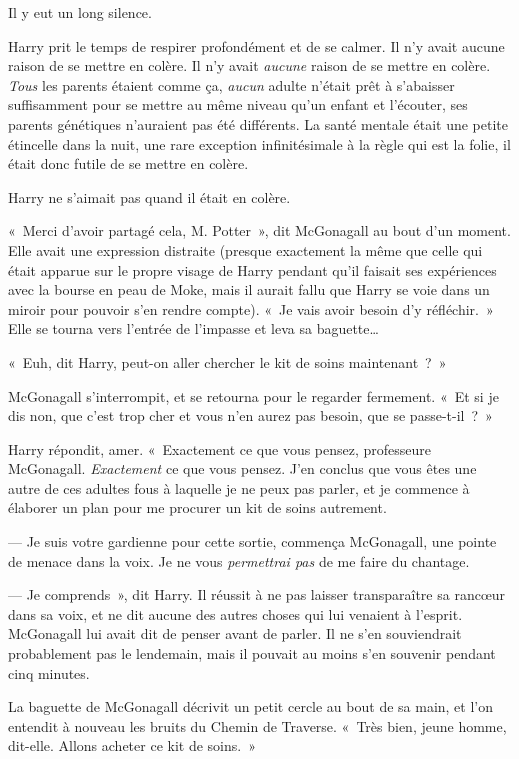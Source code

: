 Il y eut un long silence.

Harry prit le temps de respirer profondément et de se calmer.
Il n'y avait aucune raison de se mettre en colère.
Il n'y avait \emph{aucune} raison de se mettre en colère.
\emph{Tous} les parents étaient comme ça, \emph{aucun} adulte n'était prêt à s'abaisser suffisamment pour se mettre au même niveau qu'un enfant et l'écouter, ses parents génétiques n'auraient pas été différents.
La santé mentale était une petite étincelle dans la nuit, une rare exception infinitésimale à la règle qui est la folie, il était donc futile de se mettre en colère.

Harry ne s'aimait pas quand il était en colère.

«~Merci d'avoir partagé cela, M. Potter~», dit McGonagall au bout d'un moment.
Elle avait une expression distraite (presque exactement la même que celle qui était apparue sur le propre visage de Harry pendant qu'il faisait ses expériences avec la bourse en peau de Moke, mais il aurait fallu que Harry se voie dans un miroir pour pouvoir s'en rendre compte).
«~Je vais avoir besoin d'y réfléchir.~» Elle se tourna vers l'entrée de l'impasse et leva sa baguette…

«~Euh, dit Harry, peut-on aller chercher le kit de soins maintenant~?~»

McGonagall s'interrompit, et se retourna pour le regarder fermement. «~Et si je dis non, que c'est trop cher et vous n'en aurez pas besoin, que se passe-t-il~?~»

Harry répondit, amer.
«~Exactement ce que vous pensez, professeure McGonagall. \emph{Exactement} ce que vous pensez.
J'en conclus que vous êtes une autre de ces adultes fous à laquelle je ne peux pas parler, et je commence à élaborer un plan pour me procurer un kit de soins autrement.

--- Je suis votre gardienne pour cette sortie, commença McGonagall, une pointe de menace dans la voix. Je ne vous \emph{permettrai pas} de me faire du chantage.

--- Je comprends~», dit Harry. Il réussit à ne pas laisser transparaître sa rancœur dans sa voix, et ne dit aucune des autres choses qui lui venaient à l'esprit. McGonagall lui avait dit de penser avant de parler. Il ne s'en souviendrait probablement pas le lendemain, mais il pouvait au moins s'en souvenir pendant cinq minutes.

La baguette de McGonagall décrivit un petit cercle au bout de sa main, et l'on entendit à nouveau les bruits du Chemin de Traverse. «~Très bien, jeune homme, dit-elle. Allons acheter ce kit de soins.~»

